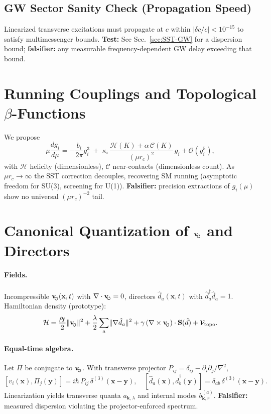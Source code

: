 \documentclass[10pt,reprint,aps,onecolumn,nofootinbib]{revtex4-2}
\newcommand{\vswirl}{\mathbf{v}_{\!\mkern-2mu\scriptscriptstyle\boldsymbol{\circlearrowleft}}}
\newcommand{\rhof}{\rho_{\!f}}                           %
\newcommand{\rhoF}{\rhof}
\newcommand{\rc}{r_c}                                    %
\begin{document}
        \subsection{GW Sector Sanity Check (Propagation Speed)}
        Linearized transverse excitations must propagate at $c$ within $|\delta c/c|<10^{-15}$ to satisfy multimessenger bounds. \textbf{Test:} See Sec.~\ref{sec:SST-GW} for a dispersion bound; \textbf{falsifier:} any measurable frequency-dependent GW delay exceeding that bound.



    \section{Running Couplings and Topological \texorpdfstring{$\beta$}{beta}-Functions}
    \label{sec:SST-RG}

    We propose
    \[
        \mu\frac{d g_i}{d\mu} = -\frac{b_i}{2\pi}g_i^3\;+\;\kappa_i\,\frac{\mathcal{H}(K)+\alpha\,\mathcal{C}(K)}{(\mu\rc)^2}\,g_i+\mathcal{O}(g_i^5),
    \]
    with \(\mathcal{H}\) helicity (dimensionless), \(\mathcal{C}\) near-contacts (dimensionless count).
    As \(\mu\rc\to\infty\) the SST correction decouples, recovering SM running (asymptotic freedom for SU(3), screening for U(1)).
    \textbf{Falsifier:} precision extractions of \(g_i(\mu)\) show no universal \((\mu\rc)^{-2}\) tail.



    \section{Canonical Quantization of \texorpdfstring{$\vswirl$}{v_swirl} and Directors}
    \label{sec:SST-quantization}

    \paragraph{Fields.}
        Incompressible \(\vswirl(\mathbf{x},t)\) with \(\nabla\cdot\vswirl=0\),
        directors \(\hat d_a(\mathbf{x},t)\) with \(\hat d_a^\dagger\hat d_a=1\).
        Hamiltonian density (prototype):
        \[
            \mathcal{H}=\frac{\rhoF}{2}\lVert\vswirl\rVert^2+\frac{\lambda}{2}\sum_a \lVert\nabla \hat d_a\rVert^2+\gamma\,(\nabla\times\vswirl)\cdot\mathbf{S}(\hat d)+\mathcal{V}_{\text{topo}}.
        \]

    \paragraph{Equal-time algebra.}
        Let \(\Pi\) be conjugate to \(\vswirl\). With transverse projector \(P_{ij}=\delta_{ij}-\partial_i\partial_j/\nabla^2\),
        \[
            [ v_i(\mathbf{x}), \Pi_j(\mathbf{y})]= i\hbar\,P_{ij}\,\delta^{(3)}(\mathbf{x}-\mathbf{y}),\quad
            [ \hat d_a(\mathbf{x}), \hat d_b^\dagger(\mathbf{y})]=\delta_{ab}\,\delta^{(3)}(\mathbf{x}-\mathbf{y}).
        \]
        Linearization yields transverse quanta \(a_{\mathbf{k},\lambda}\) and internal modes \(b_{\mathbf{k},r}^{(a)}\).
        \textbf{Falsifier:} measured dispersion violating the projector-enforced spectrum.
\end{document}
